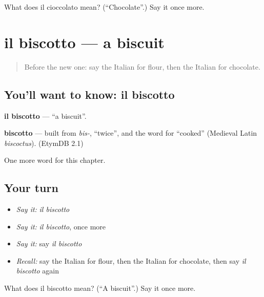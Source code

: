\begin{tcolorbox}[breakable,colback=teal!4,colframe=teal!35!black,title={Before you move on}]
What does il cioccolato mean? (\textquotedblleft{}Chocolate\textquotedblright{}.) Say it once more.
\end{tcolorbox}
\section[il biscotto]{il biscotto — a biscuit}

\label{lesson:IT-C108-biscotto}



\begin{quote}
Before the new one: say the Italian for flour, then the Italian for chocolate.
\end{quote}

\subsection*{You'll want to know: il biscotto}
\textbf{il biscotto} — \textquotedblleft{}a biscuit\textquotedblright{}.

\begin{cousinweb}
\textbf{biscotto} — built from \emph{bis-}, \textquotedblleft{}twice\textquotedblright{}, and the word for \textquotedblleft{}cooked\textquotedblright{} (Medieval Latin \emph{biscoctus}). (EtymDB 2.1)
\end{cousinweb}

\begin{grammarlens}[title={What you've built}]
One more word for this chapter.
\end{grammarlens}

\subsection*{Your turn}
\begin{itemize}
\raggedright
  \item \emph{Say it:} \emph{il biscotto}
  \item \emph{Say it:} \emph{il biscotto}, once more
  \item \emph{Say it:} say \emph{il biscotto}
  \item \emph{Recall:} say the Italian for flour, then the Italian for chocolate, then say \emph{il biscotto} again
\end{itemize}

\begin{tcolorbox}[breakable,colback=teal!4,colframe=teal!35!black,title={Before you move on}]
What does il biscotto mean? (\textquotedblleft{}A biscuit\textquotedblright{}.) Say it once more.
\end{tcolorbox}
